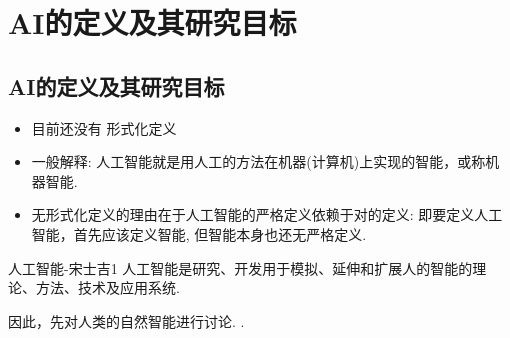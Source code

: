 \section{AI的定义及其研究目标}
\subsection{AI的定义及其研究目标}
\begin{itemize}
\item 目前还没有 形式化定义

\item 一般解释: 人工智能就是用人工的方法在机器(计算机)上实现的智能，或称机器智能.

\item 无形式化定义的理由在于人工智能的严格定义依赖于对的定义: 即要定义人工智能，首先应该定义智能,  但智能本身也还无严格定义.
\end{itemize}
\begin{mydef}{人工智能-宋士吉}{1}
人工智能是研究、开发用于模拟、延伸和扩展人的智能的理论、方法、技术及应用系统.
\end{mydef}
因此，先对人类的自然智能进行讨论. .
